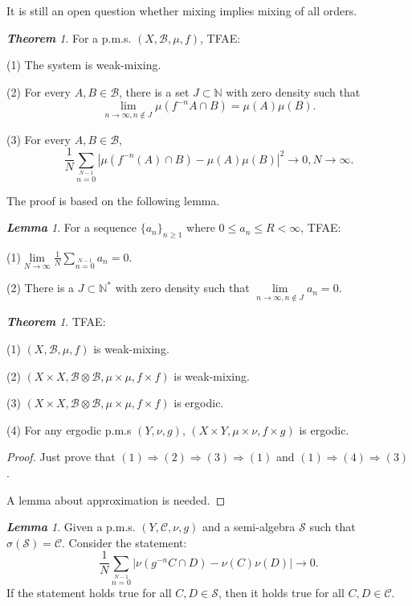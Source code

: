 \documentclass[10pt, a4paper, oneside]{report}
\numberwithin{equation}{chapter}
\theoremstyle{remark}
\newtheorem{theorem}[definition]{\bf{Theorem}}
\newtheorem{lemma}[definition]{\bf{Lemma}}
\theoremstyle{remark}
\begin{document}
    It is still an open question whether mixing implies mixing of all orders.

\begin{theorem}
        For a p.m.s. $(X,\mathcal{B},\mu,f)$, TFAE:

        (1) The system is weak-mixing.

        (2) For every $A,B\in\mathcal{B}$, there is a set $J\subset\mathbb{N}$ with zero density such that $$\lim\limits_{n\to\infty,n\notin J}\mu(f^{-n}A\cap B)=\mu(A)\mu(B).$$
        
        (3) For every $A,B\in\mathcal{B}$, $$\frac{1}{N}\sum\limits_{n=0}\limits^{N-1}|\mu(f^{-n}(A)\cap B)-\mu(A)\mu(B)|^2\to 0,N\to\infty.$$
\end{theorem}

    The proof is based on the following lemma.

\begin{lemma}
    For a sequence $\{a_n\}_{n\geqslant 1}$ where $0\leqslant a_n\leqslant R<\infty$, TFAE:

    (1)$\lim\limits_{N\to\infty}\frac{1}{N}\sum\limits_{n=0}\limits^{N-1}a_n=0$.

    (2) There is a $J\subset\mathbb{N}^*$ with zero density such that $\lim\limits_{n\to\infty,n\notin J}a_n=0.$
\end{lemma}

\begin{theorem}
    TFAE:

    (1) $(X,\mathcal{B},\mu,f)$ is weak-mixing.

    (2) $(X\times X,\mathcal{B}\otimes\mathcal{B},\mu\times\mu,f\times f)$ is weak-mixing.

    (3) $(X\times X,\mathcal{B}\otimes\mathcal{B},\mu\times\mu,f\times f)$ is ergodic.

    (4) For any ergodic p.m.s $(Y,\nu,g)$, $(X\times Y,\mu\times\nu,f\times g)$ is ergodic.
\end{theorem}

\begin{proof}
    Just prove that $(1)\Rightarrow(2)\Rightarrow(3)\Rightarrow(1)$ and $(1)\Rightarrow(4)\Rightarrow(3)$.

    A lemma about approximation is needed.
\end{proof}

\begin{lemma}
    Given a p.m.s. $(Y,\mathcal{C},\nu,g)$ and a semi-algebra $\mathcal{S}$ such that $\sigma(\mathcal{S})=\mathcal{C}$. Consider the statement:
    $$\frac{1}{N}\sum\limits_{n=0}\limits^{N-1}|\nu(g^{-n}C\cap D)-\nu(C)\nu(D)|\to 0.$$
    If the statement holds true for all $C,D\in\mathcal{S}$, then it holds true for all $C,D\in\mathcal{C}.$
\end{lemma}
\end{document}
